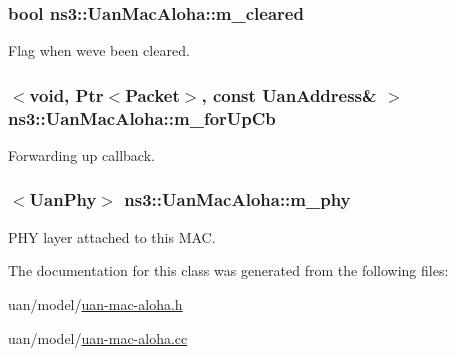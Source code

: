 \subsubsection[{\texorpdfstring{m\+\_\+cleared}{m_cleared}}]{\setlength{\rightskip}{0pt plus 5cm}bool ns3\+::\+Uan\+Mac\+Aloha\+::m\+\_\+cleared\hspace{0.3cm}{\ttfamily [private]}}\hypertarget{classns3_1_1UanMacAloha_a4ded12134d8b3461ddac233d9eea4dc0}{}\label{classns3_1_1UanMacAloha_a4ded12134d8b3461ddac233d9eea4dc0}
Flag when we\textquotesingle{}ve been cleared. 
\subsubsection[{\texorpdfstring{m\+\_\+for\+Up\+Cb}{m_forUpCb}}]{$<$void, {\bf Ptr}$<${\bf Packet}$>$, const {\bf Uan\+Address}\& $>$ ns3\+::\+Uan\+Mac\+Aloha\+::m\+\_\+for\+Up\+Cb\hspace{0.3cm}{\ttfamily [private]}}\hypertarget{classns3_1_1UanMacAloha_a7ffb8c0a17eb6cabf3ec8ca890e5f02c}{}\label{classns3_1_1UanMacAloha_a7ffb8c0a17eb6cabf3ec8ca890e5f02c}
Forwarding up callback. 
\subsubsection[{\texorpdfstring{m\+\_\+phy}{m_phy}}]{$<${\bf Uan\+Phy}$>$ ns3\+::\+Uan\+Mac\+Aloha\+::m\+\_\+phy\hspace{0.3cm}{\ttfamily [private]}}\hypertarget{classns3_1_1UanMacAloha_a28a92b970612d357a2b8309e5b8d5fe5}{}\label{classns3_1_1UanMacAloha_a28a92b970612d357a2b8309e5b8d5fe5}
P\+HY layer attached to this M\+AC. 

The documentation for this class was generated from the following files\+:\begin{DoxyCompactItemize}
\item 
uan/model/\hyperlink{uan-mac-aloha_8h}{uan-\/mac-\/aloha.\+h}\item 
uan/model/\hyperlink{uan-mac-aloha_8cc}{uan-\/mac-\/aloha.\+cc}\end{DoxyCompactItemize}
